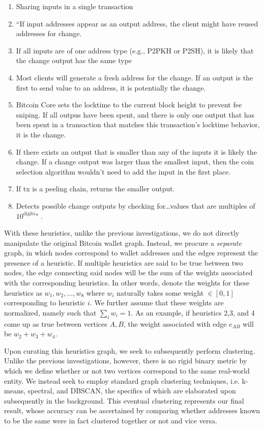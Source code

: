 \documentclass{article}
\begin{document}
\begin{enumerate}
    \item Sharing inputs in a single transaction
    \item ``If input addresses appear as an output address, the client might have reused addresses for change.
    \item If all inputs are of one address type (e.g., P2PKH or P2SH), it is likely that the change output has the same type
    \item Most clients will generate a fresh address for the change. If an output is the first to send value to an address, it is potentially the change.
    \item Bitcoin Core sets the locktime to the current block height to prevent fee sniping. If all outpus have been spent, and there is only one output that has been spent in a transaction that matches this transaction’s locktime behavior, it is the change.
    \item If there exists an output that is smaller than any of the inputs it is likely the change. If a change output was larger than the smallest input, then the coin selection algorithm wouldn’t need to add the input in the first place.
    \item If tx is a peeling chain, returns the smaller output.
    \item Detects possible change outputs by checking for\dots values that are multiples of $10^{\text{digits}}$" \cite{heuristics}.
\end{enumerate}

With these heuristics, unlike the previous investigations, we do not directly manipulate the original Bitcoin wallet graph. Instead, we procure a \textit{separate} graph, in which nodes correspond to wallet addresses and the edges represent the presence of a heuristic. If multiple heuristics are said to be true between two nodes, the edge connecting said nodes will be the sum of the weights associated with the corresponding heuristics. In other words, denote the weights for these heuristics as $w_1, w_2, ..., w_8$ where $w_i$ naturally takes some weight $\in[0,1]$ corresponding to heuristic $i$. We further assume that these weights are normalized, namely such that $\sum_i w_i = 1$. As an example, if heuristics 2,3, and 4 come up as true between vertices $A,B$, the weight associated with edge $e_{AB}$ will be $w_2+w_3+w_4$.

Upon curating this heuristics graph, we seek to subsequently perform clustering. Unlike the previous investigations, however, there is no rigid binary metric by which we define whether or not two vertices correspond to the same real-world entity. We instead seek to employ standard graph clustering techniques, i.e. k-means, spectral, and DBSCAN, the specifics of which are elaborated upon subsequently in the background. This eventual clustering represents our final result, whose accuracy can be ascertained by comparing whether addresses known to be the same were in fact clustered together or not and vice versa.
\end{document}
